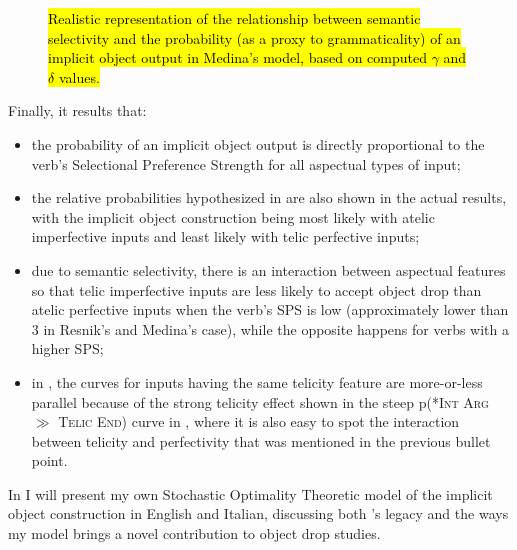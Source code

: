 \begin{figure}[htb]
\caption{\hl{Realistic representation of the relationship between semantic selectivity and the probability (as a proxy to grammaticality) of an implicit object output in Medina's model, based on computed $\gamma$ and $\delta$ values.}}
\end{figure}

Finally, it results that:
\begin{itemize}
    \item the probability of an implicit object output is directly proportional to the verb's Selectional Preference Strength for all aspectual types of input;
    \item the relative probabilities hypothesized in  are also shown in the actual results, with the implicit object construction being most likely with atelic imperfective inputs and least likely with telic perfective inputs;
    \item due to semantic selectivity, there is an interaction between aspectual features so that telic imperfective inputs are less likely to accept object drop than atelic perfective inputs when the verb's SPS is low (approximately lower than 3 in Resnik's and Medina's case), while the opposite happens for verbs with a higher SPS;
    \item in , the curves for inputs having the same telicity feature are more-or-less parallel because of the strong telicity effect shown in the steep p(\textsc{*Int Arg} $\gg$ \textsc{Telic End}) curve in , where it is also easy to spot the interaction between telicity and perfectivity that was mentioned in the previous bullet point.
\end{itemize}

In  I will present my own Stochastic Optimality Theoretic model of the implicit object construction in English and Italian, discussing both \textcite{Medina2007}'s legacy and the ways my model brings a novel contribution to object drop studies.
